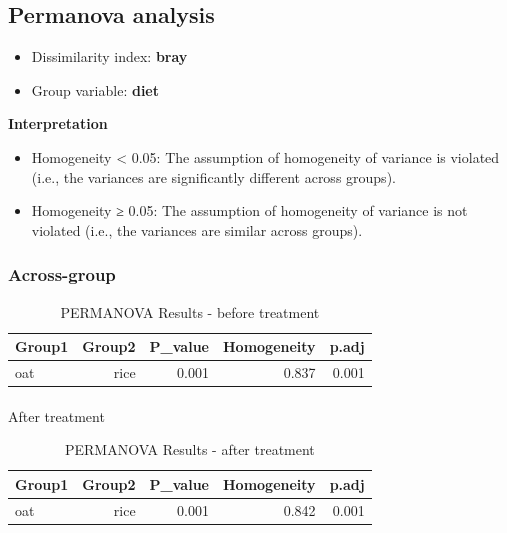 \documentclass[
]{article}
\makeatletter
\let\oldparagraph\paragraph
\renewcommand{\paragraph}{
    \@ifstar
      \xxxParagraphStar
      \xxxParagraphNoStar
  }
\newcommand{\xxxParagraphStar}[1]{\oldparagraph*{#1}\mbox{}}
\newcommand{\xxxParagraphNoStar}[1]{\oldparagraph{#1}\mbox{}}
\makeatother
\begin{document}
\subsection{Permanova analysis}\label{permanova-analysis}

\begin{itemize}
\item
  Dissimilarity index: \textbf{bray}
\item
  Group variable: \textbf{diet}
\end{itemize}

\textbf{Interpretation}

\begin{itemize}
\item
  Homogeneity \textless{} 0.05: The assumption of homogeneity of
  variance is violated (i.e., the variances are significantly different
  across groups).
\item
  Homogeneity ≥ 0.05: The assumption of homogeneity of variance is not
  violated (i.e., the variances are similar across groups).
\end{itemize}

\subsubsection{Across-group}\label{across-group}

\begin{table}

\caption{PERMANOVA Results - before treatment}
\centering
\begin{tabular}[t]{lrrrr}
\toprule
\textbf{Group1} & \textbf{Group2} & \textbf{P\_value} & \textbf{Homogeneity} & \textbf{p.adj}\\
\midrule
oat & rice & 0.001 & 0.837 & 0.001\\
\bottomrule
\end{tabular}
\end{table}

\paragraph{After treatment}\label{after-treatment}

\begin{table}

\caption{PERMANOVA Results - after treatment}
\centering
\begin{tabular}[t]{lrrrr}
\toprule
\textbf{Group1} & \textbf{Group2} & \textbf{P\_value} & \textbf{Homogeneity} & \textbf{p.adj}\\
\midrule
oat & rice & 0.001 & 0.842 & 0.001\\
\bottomrule
\end{tabular}
\end{table}
\end{document}
